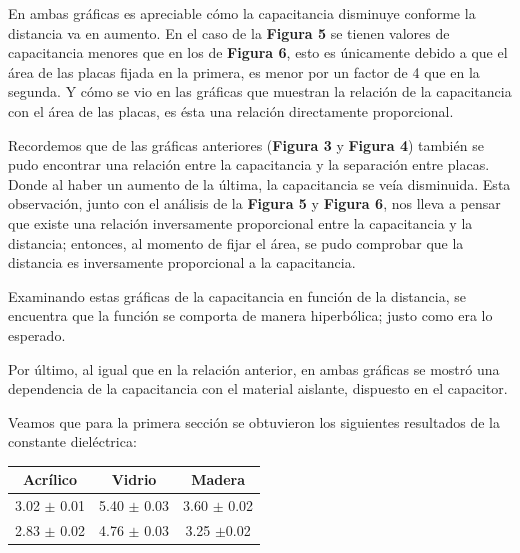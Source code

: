 \documentclass[letterpaper, 11 pt]{article}
\begin{document}
\begin{multicols}{2}
En ambas gráficas es apreciable cómo la capacitancia disminuye conforme la distancia va en aumento. En el caso de la \textbf{Figura 5} se tienen valores de capacitancia menores que en los de \textbf{Figura 6}, esto es únicamente debido a que el área de las placas fijada en la primera, es menor por un factor de 4 que en la segunda. Y cómo se vio en las gráficas que muestran la relación de la capacitancia con el área de las placas, es ésta una relación directamente proporcional. 

Recordemos que de las gráficas anteriores (\textbf{Figura 3} y \textbf{Figura 4}) también se pudo encontrar una relación entre la capacitancia y la separación entre placas. Donde al haber un aumento de la última, la capacitancia se veía disminuida. Esta observación, junto con el análisis de la \textbf{Figura 5} y \textbf{Figura 6}, nos lleva a pensar que existe una relación inversamente proporcional entre la capacitancia y la distancia; entonces, al momento de fijar el área, se pudo comprobar que la distancia es inversamente proporcional a la capacitancia.

Examinando estas gráficas de la capacitancia en función de la distancia,
se encuentra que la función se comporta de manera hiperbólica; justo como era lo esperado. 

Por último, al igual que en la relación anterior, en ambas gráficas se mostró una dependencia de la capacitancia con el material aislante, dispuesto en el capacitor.


Veamos que para la primera sección se obtuvieron los siguientes resultados de la constante dieléctrica:

 \begin{table}[H]
   \centering
     \begin{tabular}{|c|c|c|} \hline
     Acrílico & Vidrio & Madera \\ \hline
     
     3.02 $\pm$ 0.01    & 5.40 $\pm$ 0.03    &   3.60 $\pm$ 0.02 \\ \hline
     
    2.83 $\pm$ 0.02    & 4.76 $\pm$ 0.03     &    3.25 $\pm$0.02 \\ \hline
    

\end{tabular}
\end{table}
\end{multicols}
\end{document}
